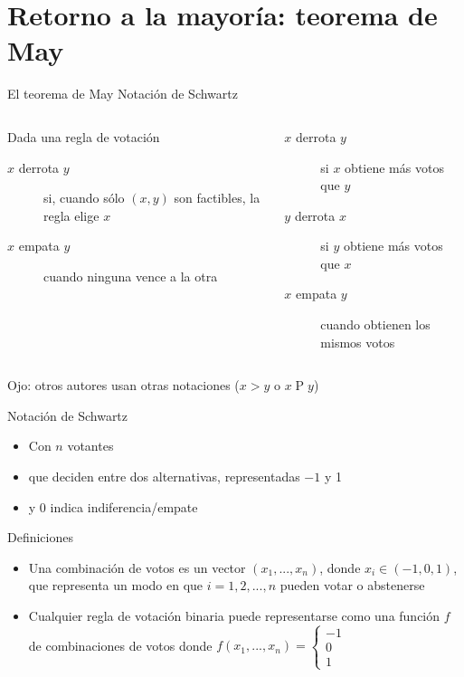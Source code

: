 \documentclass[bigger]{beamer}
\begin{document}
\section{Retorno a la mayoría: teorema de May}
\label{sec:orgfe27663}
\begin{frame}[label={sec:orga26ba19}]{El teorema de May}
Notación de Schwartz
\begin{columns}
\begin{column}{.5\columnwidth}
\begin{block}{Dada una regla de votación}
\begin{description}
\item[{\(x\) derrota \(y\)}] si, cuando sólo \((x,y)\) son factibles, la regla elige \(x\)
\item[{\(x\) empata \(y\)}] cuando ninguna vence a la otra
\end{description}
\bigskip \pause
\end{block}
\end{column}
\begin{column}{.5\columnwidth}
\begin{example}
\begin{description}
\item[{\(x\) derrota \(y\)}] si \(x\) obtiene más votos que \(y\)
\item[{\(y\) derrota \(x\)}] si \(y\) obtiene más votos que \(x\)
\item[{\(x\) empata \(y\)}] cuando obtienen los mismos votos
\end{description}
\end{example}
\end{column}
\end{columns}
\bigskip
Ojo: otros autores usan otras notaciones (\(x>y\) o \(x\;\text{P}\;y\))
\end{frame}

\begin{frame}[label={sec:org3183690}]{Notación de Schwartz}
\begin{itemize}
\item Con \(n\) votantes
\item que deciden entre dos alternativas, representadas \(-1\) y 1
\item y 0 indica indiferencia/empate
\end{itemize}
\begin{block}{Definiciones}
\begin{itemize}
\item Una \alert{combinación de votos} es un vector \((x_1,...,x_n)\), donde \(x_i\in(-1,0,1)\), que representa un modo en que \(i=1,2,...,n\) pueden votar o abstenerse
\item Cualquier \alert{regla de votación binaria} puede representarse como una función \(f\) de combinaciones de votos donde \(f(x_1,...,x_n)=\begin{cases}-1\\0\\1\end{cases}\)
\end{itemize}
\end{block}
\end{frame}
\end{document}

